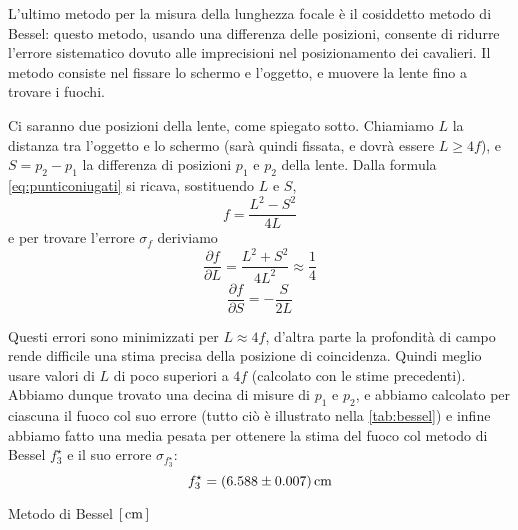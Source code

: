 L'ultimo metodo per la misura della lunghezza focale è il cosiddetto 
metodo di Bessel: questo metodo, usando una differenza delle 
posizioni, consente di ridurre l'errore sistematico dovuto alle 
imprecisioni nel posizionamento dei cavalieri. Il metodo consiste 
nel fissare lo schermo e l'oggetto, e muovere la lente fino a 
trovare i fuochi. 

Ci saranno due posizioni della lente, come spiegato sotto. Chiamiamo 
$L$ la distanza tra l'oggetto e lo schermo (sarà quindi fissata, e 
dovrà essere $L \geq 4f$), e $S=p_2-p_1$ la differenza di posizioni $p_1$ e $p_2$ della 
lente.  Dalla formula \eqref{eq:punticoniugati} si ricava, 
sostituendo $L$ e $S$,
\begin{equation}
f = \frac{L^2-S^2}{4L}
\end{equation}
e per trovare l'errore $\sigma_f$ deriviamo
\begin{equation*} \label{eq:dfdl}
\frac{\partial f}{\partial L} = \frac{L^2+S^2}{4L^2} \approx \frac{1}{4}
\end{equation*}
\begin{equation*}
\frac{\partial f}{\partial S} = -\frac{S}{2L}
\end{equation*}

Questi errori sono minimizzati per $L \approx 4f$, d'altra parte la 
profondità di campo rende difficile una stima precisa della 
posizione di coincidenza. Quindi meglio usare valori di $L$ di poco 
superiori a $4f$ (calcolato con le stime precedenti). Abbiamo dunque 
trovato una decina di misure di $p_1$ e $p_2$, e abbiamo calcolato per 
ciascuna il fuoco col suo errore (tutto ciò è illustrato nella 
\autoref{tab:bessel}) e infine abbiamo fatto una media pesata per 
ottenere la stima del fuoco col metodo di Bessel $f^{\star}_3$ e il 
suo errore $\sigma_{f^{\star}_3}$:
\begin{equation}
f^{\star}_3 = (6.588 \pm 0.007) \,\mathrm{cm}
\end{equation}
\begin{tabella}
	\centering
	
	\caption{Metodo di Bessel $[\,\mathrm{cm}\,]$}
	\label{tab:bessel}
\end{tabella}
